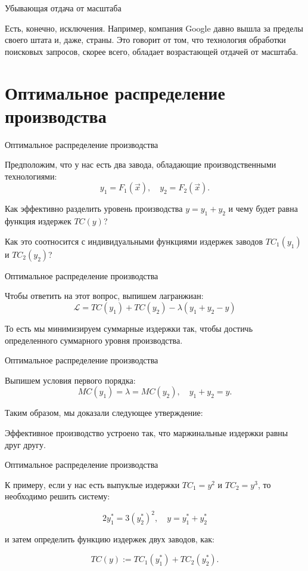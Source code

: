 \documentclass{beamer}
\begin{document}
\begin{frame}{Убывающая отдача от масштаба}

Есть, конечно, исключения. Например, компания Google давно вышла за пределы своего штата и, даже, страны. Это говорит от том, что технология обработки поисковых запросов, скорее всего, обладает возрастающей отдачей от масштаба.

\end{frame}

\section{Оптимальное распределение производства}

\begin{frame}{Оптимальное распределение производства}

Предположим, что у нас есть два завода, обладающие производственными технологиями:
$$ y_1 = F_1(\vec x), \quad y_2 = F_2(\vec x).$$

Как эффективно разделить уровень производства $y = y_1 + y_2$ и чему будет равна функция издержек $TC(y)$? 

Как это соотносится с индивидуальными функциями издержек заводов $TC_1(y_1)$ и $TC_2(y_2)$?

\end{frame}

\begin{frame}{Оптимальное распределение производства}

Чтобы ответить на этот вопрос, выпишем лагранжиан:
$$ \mathcal{L} = TC(y_1) + TC(y_2) - \lambda (y_1 + y_2 - y)$$

То есть мы минимизируем суммарные издержки так, чтобы достичь определенного суммарного уровня производства.

\end{frame}

\begin{frame}{Оптимальное распределение производства}

Выпишем условия первого порядка:
$$ MC(y_1) = \lambda = MC(y_2), \quad y_1 + y_2 = y.$$

Таким образом, мы доказали следующее утверждение:
\begin{lemma}
Эффективное производство устроено так, что маржинальные издержки равны друг другу.
\end{lemma}

\end{frame}

\begin{frame}{Оптимальное распределение производства}

К примеру, если у нас есть выпуклые издержки $TC_1 = y^2$ и $TC_2 = y^3$, то необходимо решить систему:

$$ 2y_1^{\ast} = 3(y_2^{\ast})^2, \quad y = y_1^{\ast} + y_2^{\ast}$$

и затем определить функцию издержек двух заводов, как:

$$ TC(y) := TC_1(y_1^{\ast}) + TC_2(y_2^{\ast}).$$

\end{frame}
\end{document}
